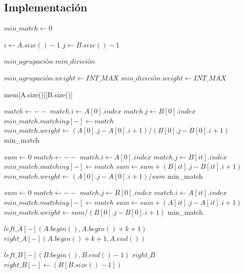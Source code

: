 \documentclass{article}
\begin{document}
\subsection{Implementación}
\begin{algorithmic}

\STATE $min\_match\gets 0$

\STATE $i\gets A.size()-1$
\STATE $j\gets B.size()-1$

\STATE $min\_agrupaci{ó}n$
\STATE $min\_divici{ó}n$

\STATE $min\_agrupaci{ó}n.weight\gets INT\_MAX$
\STATE $min\_divici{ó}n.weight\gets INT\_MAX$

                \RETURN mem[A.size()][B.size()]
            \ENDIF
        \ENDIF
\ENDIF 

        \STATE $match\gets - -$
        \STATE $match.i\gets A[0].index$
        \STATE $match.j\gets B[0].index$
        \STATE $min\_match.matching[-]\gets match$
        \STATE $min\_match.weight\gets (A[0].j - A[0].i + 1) / (B[0].j - B[0].i + 1)$
        \RETURN min\_match
\ENDIF 

        \STATE $sum\gets 0$
        \STATE $match\gets - -$
        \STATE $match.i\gets A[0].index$
        \STATE $match.j\gets B[it].index$
        \STATE $min\_match.matching[-]\gets match$
        \STATE $sum\gets sum + (B[it].j - B[it].i + 1)$
        \ENDFOR
        \STATE $min\_match.weight\gets (A[0].j - A[0].i + 1) / sum$
        \RETURN min\_match
\ENDIF 

        \STATE $sum\gets 0$
        \STATE $match\gets - -$
        \STATE $match.j\gets B[0].index$
        \STATE $match.i\gets A[it].index$
        \STATE $min\_match.matching[-]\gets match$
        \STATE $sum\gets sum + (A[it].j - A[it].i + 1)$
        \ENDFOR
        \STATE $min\_match.weight\gets sum / (B[0].j - B[0].i + 1)$
        \RETURN min\_match
\ENDIF

    \STATE $left\_A[-](A.begin(),A.begin()+k+1)$
    \STATE $right\_A[-](A.begin()+k+1,A.end())$
    
    \STATE $left\_B[-](B.begin(),B.end()-1)$
    \STATE $right\_B$
    \STATE $right\_B[-]\gets (B[B.size()-1])$
    

\end{algorithmic}
\end{document}

